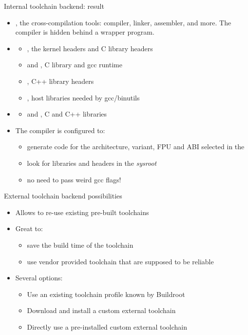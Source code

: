 \begin{frame}{Internal toolchain backend: result}
  \begin{itemize}
  \item {}, the cross-compilation
    tools: compiler, linker, assembler, and more. The compiler is
    hidden behind a wrapper program.
  \item {}
    \begin{itemize}
    \item {}, the kernel
      headers and C library headers
    \item {} and , C library and
      gcc runtime
    \item {}, C++ library headers
    \item {}, host libraries needed by gcc/binutils
    \end{itemize}
  \item {}
    \begin{itemize}
    \item {} and , C and C++ libraries
    \end{itemize}
  \item The compiler is configured to:
    \begin{itemize}
    \item generate code for the architecture, variant, FPU and ABI
      selected in the 
    \item look for libraries and headers in the {\em sysroot}
    \item no need to pass weird gcc flags!
    \end{itemize}
  \end{itemize}
\end{frame}

\begin{frame}{External toolchain backend possibilities}
  \begin{itemize}
  \item Allows to re-use existing pre-built toolchains
  \item Great to:
    \begin{itemize}
    \item save the build time of the toolchain
    \item use vendor provided toolchain that are supposed to be
      reliable
    \end{itemize}
  \item Several options:
    \begin{itemize}
    \item Use an existing toolchain profile known by Buildroot
    \item Download and install a custom external toolchain
    \item Directly use a pre-installed custom external toolchain
    \end{itemize}
  \end{itemize}
\end{frame}

